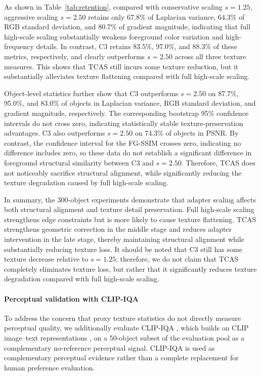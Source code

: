 \documentclass[times,twocolumn,final]{elsarticle}
\providecommand{\DIFadd}[1]{{\protect\color{blue} \sf #1}} %
\providecommand{\DIFdel}[1]{{\protect\color{red} \scriptsize #1}} %
\providecommand{\DIFaddbegin}{} %
\providecommand{\DIFaddend}{} %
\providecommand{\DIFdelbegin}{} %
\providecommand{\DIFdelend}{} %
\newcommand{\DIFscaledelfig}{0.5}
\newlength{\DIFdelgraphicswidth} %
\newlength{\DIFdelgraphicsheight} %
\newcommand{\DIFaddincludegraphics}[2][]{{\color{blue}\fbox{\DIFOincludegraphics[#1]{#2}}}} %
\newcommand{\DIFdelincludegraphics}[2][]{%
\sbox{\DIFdelgraphicsbox}{\DIFOincludegraphics[#1]{#2}}%
\settoboxwidth{\DIFdelgraphicswidth}{\DIFdelgraphicsbox} %
\settoboxtotalheight{\DIFdelgraphicsheight}{\DIFdelgraphicsbox} %
\scalebox{\DIFscaledelfig}{%
\parbox[b]{\DIFdelgraphicswidth}{\usebox{\DIFdelgraphicsbox}\\[-\baselineskip] \rule{\DIFdelgraphicswidth}{0em}}\llap{\resizebox{\DIFdelgraphicswidth}{\DIFdelgraphicsheight}{%
\setlength{\unitlength}{\DIFdelgraphicswidth}%
\begin{picture}(1,1)%
\thicklines\linethickness{2pt} %
{\color[rgb]{1,0,0}\put(0,0){\framebox(1,1){}}}%
{\color[rgb]{1,0,0}\put(0,0){\line( 1,1){1}}}%
{\color[rgb]{1,0,0}\put(0,1){\line(1,-1){1}}}%
\end{picture}%
}\hspace*{3pt}}} %
} %
\DeclareRobustCommand{\DIFaddbegin}{\DIFOaddbegin \let\includegraphics\DIFaddincludegraphics} %
\DeclareRobustCommand{\DIFaddend}{\DIFOaddend \let\includegraphics\DIFOincludegraphics} %
\DeclareRobustCommand{\DIFdelbegin}{\DIFOdelbegin \let\includegraphics\DIFdelincludegraphics} %
\DeclareRobustCommand{\DIFdelend}{\DIFOaddend \let\includegraphics\DIFOincludegraphics} %
\begin{document}
As shown in Table~\ref{tab:retention}, compared with conservative scaling $s = 1.25$, aggressive scaling $s = 2.50$ retains only 67.8\% of Laplacian variance, 64.3\% of RGB standard deviation, and 80.7\% of gradient magnitude, indicating that full high-scale scaling substantially weakens foreground color variation and high-frequency details. In contrast, C3 retains 83.5\%, 97.0\%, and 88.3\% of these metrics, respectively, and clearly outperforms $s = 2.50$ across all three texture measures. This shows that TCAS still incurs some texture reduction, but it substantially alleviates texture flattening compared with full high-scale scaling.

Object-level statistics further show that C3 outperforms $s = 2.50$ on 87.7\%, 95.0\%, and 83.0\% of objects in Laplacian variance, RGB standard deviation, and gradient magnitude, respectively. The corresponding bootstrap 95\% confidence intervals do not cross zero, indicating statistically stable texture-preservation advantages. C3 also outperforms $s = 2.50$ on 74.3\% of objects in PSNR. By contrast, the confidence interval for \DIFaddbegin \DIFadd{the }\DIFaddend FG-SSIM \DIFdelbegin \DIFdel{crosses zero, indicating no }\DIFdelend \DIFaddbegin \DIFadd{difference includes zero, so these data do not establish a }\DIFaddend significant difference in foreground structural similarity between C3 and $s = 2.50$. Therefore, TCAS does not noticeably sacrifice structural alignment, while significantly reducing the texture degradation caused by full high-scale scaling.

In summary, the 300-object experiments demonstrate that adapter scaling affects both structural alignment and texture detail preservation. Full high-scale scaling strengthens edge constraints but is more likely to cause texture flattening. TCAS strengthens geometric correction in the middle stage and reduces adapter intervention in the late stage, thereby maintaining structural alignment while substantially reducing texture loss. It should be noted that C3 still has some texture decrease relative to $s = 1.25$; therefore, we do not claim that TCAS completely eliminates texture loss, but rather that it significantly reduces texture degradation compared with full high-scale scaling.

\DIFaddbegin \paragraph{\DIFadd{Perceptual validation with CLIP-IQA}}
\DIFadd{To address the concern that proxy texture statistics do not directly measure perceptual quality, we additionally evaluate CLIP-IQA \cite{wang2023clipiqa}, which builds on CLIP image--text representations \cite{radford2021clip}, on a 50-object subset of the evaluation pool as a complementary no-reference perceptual signal. CLIP-IQA is used as complementary perceptual evidence rather than a complete replacement for human preference evaluation.
}
\end{document}
